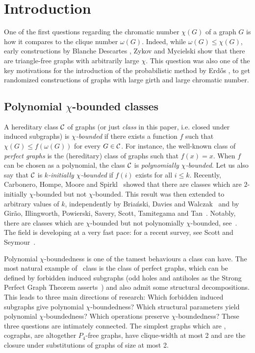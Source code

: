 \section{Introduction}

One of the first questions regarding the chromatic number $\chi (G)$ of a graph $G$ is how it compares to the clique number $\omega (G)$. Indeed, while $\omega (G)\leq \chi (G)$, early constructions by Blanche Descartes \cite{BD54}, Zykov \cite{ZY52} and Mycielski \cite{MY55} show that there are triangle-free graphs with arbitrarily large $\chi$. This question was also one of the key motivations for the introduction of the probabilistic method by Erd\H{o}s \cite{ER59}, to get randomized constructions of graphs with large girth and large chromatic number.

\subsection{Polynomial $\chi$-bounded classes}
A hereditary class $\cal C$ of graphs (or just \emph{class} in this paper, i.e. closed under induced subgraphs)  is \emph{$\chi$-bounded} if there exists a function $f$ such that $\chi(G)\leq f(\omega (G))$ for every $G\in \cal C$. For instance, the well-known class of \emph{perfect graphs} is the (hereditary) class of graphs such that $f(x)=x$. When $f$ can be chosen as a polynomial, the class $\cal C$ is 
\emph{polynomially $\chi$-bounded}. Let us also say that $\cal C$ is \emph{$k$-initially $\chi$-bounded} if $f(i)$ exists for all $i\leq k$. 
Recently, Carbonero, Hompe, Moore and Spirkl~\cite{CHMS23} showed that there are classes which are $2$-initially $\chi$-bounded but not $\chi$-bounded. 
This result was then extended to arbitrary values of $k$, independently by Bria\'nski, Davies and Walczak~\cite{BDW22} and by Girão, Illingworth, Powierski, Savery, Scott, Tamitegama and Tan~\cite{GIPSSTT24}. Notably, there are classes which are $\chi$-bounded but not polynomially $\chi$-bounded, see~\cite{BDW22}. The field is developing at a very fast pace: for a recent survey, see Scott and Seymour~\cite{SS20}.

Polynomial $\chi$-boundedness is one of the tamest behaviours a class can have. The most natural example of \pcb~class is the class of perfect graphs, which can be defined by forbidden induced subgraphs (odd holes and antiholes as the Strong Perfect Graph Theorem asserts~\cite{CRST06}) and also admit some structural decompositions. This leads to three main directions of research: Which forbidden induced subgraphs give polynomial $\chi$-boundedness? 
Which structural parameters yield polynomial $\chi$-boundedness? Which operations preserve $\chi$-boundedness? These three questions are intimately connected. The simplest graphs which are \pcb, cographs, are altogether $P_4$-free graphs, have clique-width at most 2 and are the closure under substitutions of graphs of size at most 2.

